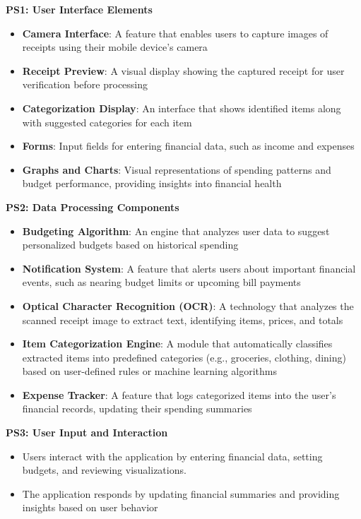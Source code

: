 \documentclass[12pt]{article}
\begin{document}
\textbf{PS1: User Interface Elements}
\begin{itemize}
  \item \textbf{Camera Interface}: A feature that enables users to capture images of receipts using their mobile device’s camera
  \item \textbf{Receipt Preview}: A visual display showing the captured receipt for user verification before processing
  \item \textbf{Categorization Display}: An interface that shows identified items along with suggested categories for each item
  \item \textbf{Forms}: Input fields for entering financial data, such as income and expenses
  \item \textbf{Graphs and Charts}: Visual representations of spending patterns and budget performance, providing insights into financial health
\end{itemize}

\noindent
\textbf{PS2: Data Processing Components}
\begin{itemize}
  \item \textbf{Budgeting Algorithm}: An engine that analyzes user data to suggest personalized budgets based on historical spending
  \item \textbf{Notification System}: A feature that alerts users about important financial events, such as nearing budget limits or upcoming bill payments
  \item \textbf{Optical Character Recognition (OCR)}: A technology that analyzes the scanned receipt image to extract text, identifying items, prices, and totals
  \item \textbf{Item Categorization Engine}: A module that automatically classifies extracted items into predefined categories (e.g., groceries, clothing, dining) based on user-defined rules or machine learning algorithms
  \item \textbf{Expense Tracker}: A feature that logs categorized items into the user’s financial records, updating their spending summaries
\end{itemize}

\noindent
\textbf{PS3: User Input and Interaction}
\begin{itemize}
  \item Users interact with the application by entering financial data, setting budgets, and reviewing visualizations. 
  \item The application responds by updating financial summaries and providing insights based on user behavior
\end{itemize}
\end{document}
